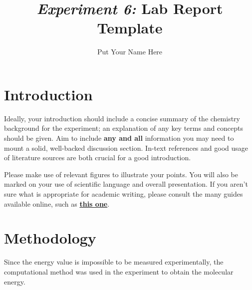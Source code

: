 \documentclass[twocolumn]{article} %
\title{\textit{Experiment 6:} Lab Report Template} %
\author{Put Your Name Here}
\begin{document}


\section{Introduction} %

Ideally, your introduction should include a concise summary of the chemistry background for the experiment; an explanation of any key terms and concepts should be given. Aim to include \textbf{any and all} information you may need to mount a solid, well-backed discussion section. In-text references and good usage of literature sources are both crucial for a good introduction.

Please make use of relevant figures to illustrate your points.
You will also be marked on your use of scientific language and overall presentation.
If you aren't sure what is appropriate for academic writing, please consult the many guides available online, such as \href{https://libguides.reading.ac.uk/writing/style}{\textbf{this one}}.



\section{Methodology}

Since the energy value is impossible to be measured experimentally, the computational method was used in the experiment to obtain the molecular energy. 
\end{document}
